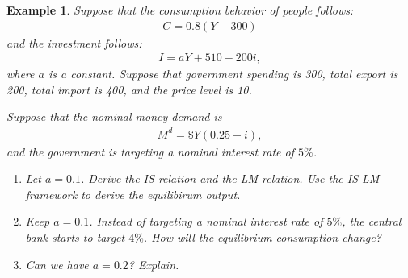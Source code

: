 \documentclass[12pt]{article}
\newtheorem{example}{Example}
\begin{document}
\begin{example}
    Suppose that the consumption behavior of people follows:
    \begin{align*}
        C = 0.8 (Y-300)
    \end{align*}
    and the investment follows:
    \begin{align*}
        I= aY + 510 - 200 i,
    \end{align*}
    where $a$ is a constant. Suppose that government spending is 300, total export is 200, total import is 400, and the price level is 10.

    Suppose that the nominal money demand is
    \begin{align*}
        M^d = \$ Y (0.25 - i),
    \end{align*}
    and the government is targeting a nominal interest rate of $5\%$.

    \begin{enumerate}[label=(\arabic*)]
        \item Let $a=0.1$. Derive the IS relation and the LM relation. Use the IS-LM framework to derive the equilibirum output.
        \item Keep $a=0.1$. Instead of targeting a nominal interest rate of $5\%$, the central bank starts to target $4\%$. How will the equilibrium consumption change?
        \item Can we have $a=0.2$? Explain. 
    \end{enumerate}
\end{example}
\end{document}
